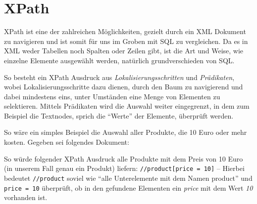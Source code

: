 \section{XPath}\label{xpath}
XPath ist eine der zahlreichen Möglichkeiten, gezielt durch ein XML
Dokument zu navigieren und ist somit für uns im Groben mit SQL zu
vergleichen. Da es in XML weder Tabellen noch Spalten oder Zeilen
gibt, ist die Art und Weise, wie einzelne Elemente ausgewählt werden,
natürlich grundverschieden von SQL.

So besteht ein XPath Ausdruck aus {\em Lokalisierungsschritten} und
{\em Prädikaten}, wobei Lokalisierungsschritte dazu dienen, durch den
Baum zu navigierend und dabei mindestens eins, unter Umständen eine
Menge von Elementen zu selektieren. Mittels Prädikaten wird die
Auswahl weiter eingegrenzt, in dem zum Beispiel die Textnodes, sprich
die "`Werte"' der Elemente, überprüft werden.

So wäre ein simples Beispiel die Auswahl aller Produkte, die 10 Euro
oder mehr kosten. Gegeben sei folgendes Dokument:




\lstset{language=XSLT}

So würde folgender XPath Ausdruck alle Produkte mit dem Preis von 10
Euro (in unserem Fall genau ein Produkt) liefern:
\lstinline{//product[price = 10]} -- Hierbei bedeutet
\lstinline{//product} soviel wie "`alle Unterelemente mit dem Namen
product"' und \lstinline{price = 10} überprüft, ob in den gefundene
Elementen ein {\em price} mit dem Wert {\em 10} vorhanden ist.

